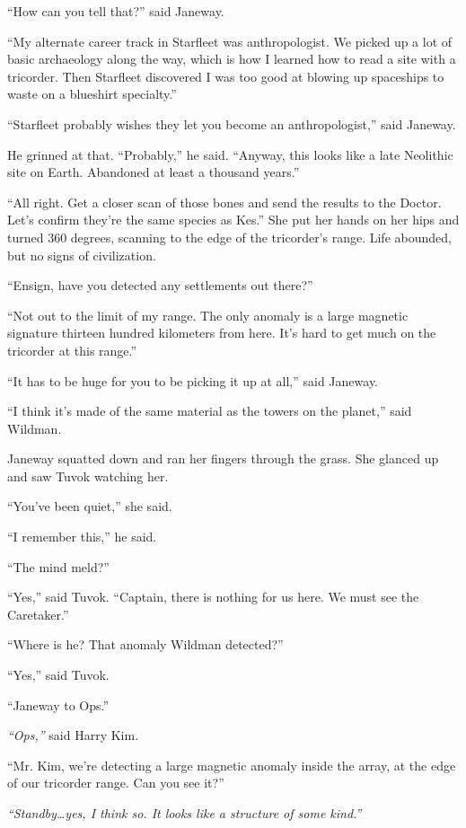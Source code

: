 \documentclass[twoside,letterpaper,12pt]{memoir}
\begin{document}
``How can you tell that?'' said Janeway. 

``My alternate career track in Starfleet was anthropologist. We picked up a lot of basic archaeology along the way, which is how I learned how to read a site with a tricorder. Then Starfleet discovered I was too good at blowing up spaceships to waste on a blueshirt specialty.'' 

``Starfleet probably wishes they let you become an anthropologist,'' said Janeway. 

He grinned at that. ``Probably,'' he said. ``Anyway, this looks like a late Neolithic site on Earth. Abandoned at least a thousand years.'' 

``All right. Get a closer scan of those bones and send the results to the Doctor. Let's confirm they're the same species as Kes.'' She put her hands on her hips and turned 360 degrees, scanning to the edge of the tricorder’s range. Life abounded, but no signs of civilization. 

``Ensign, have you detected any settlements out there?'' 

``Not out to the limit of my range. The only anomaly is a large magnetic signature thirteen hundred kilometers from here. It's hard to get much on the tricorder at this range.'' 

``It has to be huge for you to be picking it up at all,'' said Janeway. 

``I think it's made of the same material as the towers on the planet,'' said Wildman. 

Janeway squatted down and ran her fingers through the grass. She glanced up and saw Tuvok watching her. 

``You’ve been quiet,'' she said. 

``I remember this,'' he said. 

``The mind meld?'' 

``Yes,'' said Tuvok. ``Captain, there is nothing for us here. We must see the Caretaker.'' 

``Where is he? That anomaly Wildman detected?'' 

``Yes,'' said Tuvok. 

``Janeway to Ops.''

\textit{``Ops,'' }said Harry Kim. 

``Mr. Kim, we're detecting a large magnetic anomaly inside the array, at the edge of our tricorder range. Can you see it?'' 

\textit{``Standby\ldots yes, I think so. It looks like a structure of some kind.''} 
\end{document}

